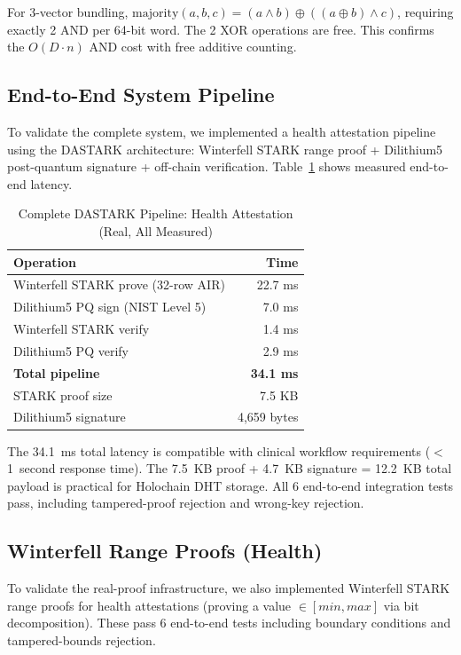 \documentclass[11pt,twocolumn]{article}
\begin{document}
For 3-vector bundling, $\mathrm{majority}(a,b,c) = (a \wedge b) \oplus ((a \oplus b) \wedge c)$, requiring exactly 2 AND per 64-bit word. The 2 XOR operations are free. This confirms the $O(D \cdot n)$ AND cost with free additive counting.

\subsection{End-to-End System Pipeline}

To validate the complete system, we implemented a health attestation pipeline using the DASTARK architecture: Winterfell STARK range proof + Dilithium5 post-quantum signature + off-chain verification. Table~\ref{tab:e2e} shows measured end-to-end latency.

\begin{table}[t]
\centering
\caption{Complete DASTARK Pipeline: Health Attestation (Real, All Measured)}
\label{tab:e2e}
\begin{tabular}{@{}lr@{}}
\toprule
\textbf{Operation} & \textbf{Time} \\
\midrule
Winterfell STARK prove (32-row AIR) & 22.7 ms \\
Dilithium5 PQ sign (NIST Level 5) & 7.0 ms \\
Winterfell STARK verify & 1.4 ms \\
Dilithium5 PQ verify & 2.9 ms \\
\textbf{Total pipeline} & \textbf{34.1 ms} \\
\midrule
STARK proof size & 7.5 KB \\
Dilithium5 signature & 4,659 bytes \\
\bottomrule
\end{tabular}
\end{table}

The 34.1~ms total latency is compatible with clinical workflow requirements ($<$1~second response time). The 7.5~KB proof + 4.7~KB signature = 12.2~KB total payload is practical for Holochain DHT storage. All 6 end-to-end integration tests pass, including tampered-proof rejection and wrong-key rejection.

\subsection{Winterfell Range Proofs (Health)}

To validate the real-proof infrastructure, we also implemented Winterfell STARK range proofs for health attestations (proving a value $\in [min, max]$ via bit decomposition). These pass 6 end-to-end tests including boundary conditions and tampered-bounds rejection.
\end{document}
